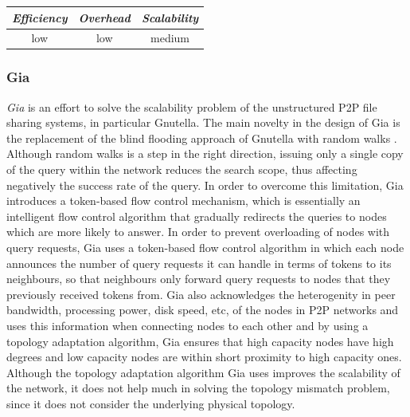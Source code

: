 \begin{center}
\begin{tabular}{ccc}
\emph{Efficiency} & \emph{Overhead} & \emph{Scalability} \\
\hline
%
low &
%
low &
%
medium
\end{tabular}
\end{center}

\subsubsection{Gia}
\emph{Gia} \cite{CRBLS2003} is an effort to solve the scalability
problem of the unstructured P2P file sharing systems, in particular Gnutella.
The main novelty in the design of Gia is the replacement of the blind flooding
approach of Gnutella with random walks \cite{lv_randomwalks_2002}. Although
random walks is a step in the right direction, issuing only a single copy of the
query within the network reduces the search scope, thus affecting negatively the
success rate of the query.  In order to overcome this limitation, Gia introduces
a token-based flow control mechanism, which is essentially an intelligent flow
control algorithm that gradually redirects the queries to nodes which are more
likely to answer. In order to prevent overloading of nodes with query requests,
Gia uses a token-based flow control algorithm in which each node announces the
number of query requests it can handle in terms of tokens to its neighbours, so
that neighbours only forward query requests to nodes that they previously
received tokens from. Gia also acknowledges the heterogenity in peer bandwidth,
processing power, disk speed, etc, of the nodes in P2P networks and uses this
information when connecting nodes to each other and by using a topology
adaptation algorithm, Gia ensures that high capacity nodes have high degrees and
low capacity nodes are within short proximity to high capacity ones.
Although the topology adaptation algorithm Gia uses improves the scalability of
the network, it does not help much in solving the topology mismatch problem,
since it does not consider the underlying physical topology.

